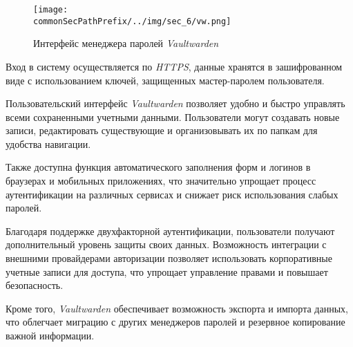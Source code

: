 \begin{figure}[ht]
    \centering
    \texttt{[image: \\commonSecPathPrefix/../img/sec\_6/vw.png]}
    \caption{Интерфейс менеджера паролей \textit{Vaultwarden}}
    \label{fig:user_guide:vw}
\end{figure}

Вход в систему осуществляется по \textit{HTTPS}, данные хранятся в зашифрованном виде с использованием ключей, защищенных мастер-паролем пользователя.

Пользовательский интерфейс \textit{Vaultwarden} позволяет удобно и быстро управлять всеми сохраненными учетными данными. Пользователи могут создавать новые записи, редактировать существующие и организовывать их по папкам для удобства навигации.

Также доступна функция автоматического заполнения форм и логинов в браузерах и мобильных приложениях, что значительно упрощает процесс аутентификации на различных сервисах и снижает риск использования слабых паролей.

Благодаря поддержке двухфакторной аутентификации, пользователи получают дополнительный уровень защиты своих данных. Возможность интеграции с внешними провайдерами авторизации позволяет использовать корпоративные учетные записи для доступа, что упрощает управление правами и повышает безопасность.

Кроме того, \textit{Vaultwarden} обеспечивает возможность экспорта и импорта данных, что облегчает миграцию с других менеджеров паролей и резервное копирование важной информации.
